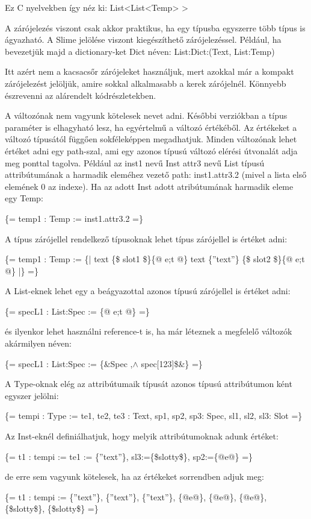 Ez C nyelvekben így néz ki: List<List<Temp> >

A zárójelezés viszont csak akkor praktikus, ha egy típusba egyszerre több típus is ágyazható. A Slime jelölése viszont kiegészíthető zárójelezéssel. Például, ha bevezetjük majd a dictionary-ket Dict néven:
List:Dict:(Text, List:Temp)

Itt azért nem a kacsacsőr zárójeleket használjuk, mert azokkal már a kompakt zárójelezést jelöljük, amire sokkal alkalmasabb a kerek zárójelnél. Könnyebb észrevenni az alárendelt kódrészletekben.

A változónak nem vagyunk kötelesek nevet adni. Későbbi verziókban a típus paraméter is elhagyható lesz, ha egyértelmű a változó értékéből. Az értékeket a változó típusától függően sokféleképpen megadhatjuk. Minden változónak lehet értéket adni egy path-szal, ami egy azonos típusú változó elérési útvonalát adja meg ponttal tagolva. Például az inst1 nevű Inst attr3 nevű List típusú attribútumának a harmadik eleméhez vezető path: inst1.attr3.2 (mivel a lista első elemének 0 az indexe). Ha az adott Inst adott atribútumának harmadik eleme egy Temp:

\{= temp1 : Temp := inst1.attr3.2 =\}

A típus zárójellel rendelkező típusoknak lehet típus zárójellel is értéket adni:

\{= temp1 : Temp := \{| text \{\$ slot1 \$\}\{@ e;t @\} text \{”text”\} \{\$ slot2 \$\}\{@ e;t @\} |\} =\}

A List-eknek lehet egy a beágyazottal azonos típusú zárójellel is értéket adni:

\{= specL1 : List:Spec := \{@ e;t @\} =\}

és ilyenkor lehet használni reference-t is, ha már léteznek a megfelelő változók akármilyen néven:

\{= specL1 : List:Spec := \{\&Spec ,$\land$ spec[123]\$\&\} =\}

A Type-oknak elég az attribútumaik típusát azonos típusú attribútumon ként egyszer jelölni:

\{= tempi : Type := te1, te2, te3 : Text, sp1, sp2, sp3: Spec, sl1, sl2, sl3: Slot =\}

Az Inst-eknél definiálhatjuk, hogy melyik attribútumoknak adunk értéket:

\{= t1 : tempi := te1 := \{”text”\}, sl3:=\{\$slotty\$\}, sp2:=\{@e@\} =\}

de erre sem vagyunk kötelesek, ha az értékeket sorrendben adjuk meg:

\{= t1 : tempi := \{”text”\}, \{”text”\}, \{”text”\}, \{@e@\}, \{@e@\}, \{@e@\}, \{\$slotty\$\}, \{\$slotty\$\} =\}

